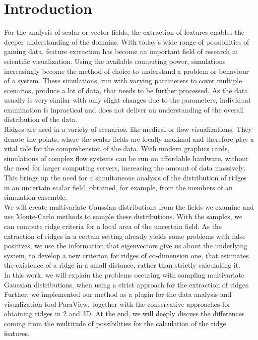 \chapter{Introduction}

For the analysis of scalar or vector fields, the extraction of features
enables the deeper understanding of the domains. With today's wide
range of possibilities of gaining data, feature extraction has become an
important field of research in scientific visualization. Using the
available computing power, simulations increasingly become the method of
choice to understand a problem or behaviour of a system. These simulations,
run with varying parameters to cover multiple scenarios, produce a lot
of data, that needs to be further processed. As the data usually is very
similar with only slight changes due to the parameters, individual
examination is inpractical and does not deliver an understanding of the
overall distribution of the data.\\
\indent Ridges are used in a variety of scenarios, like medical or flow
visualizations. They denote the points, where the scalar fields are
locally maximal and therefore play a vital role for the comprehension of
the data. With modern graphics cards, simulations of complex flow
systems can be run on affordable hardware, without the need for larger
computing servers, increasing the amount of data massively. This brings
up the need for a simultaneous analysis of the distribution of ridges in
an uncertain scalar field, obtained, for example, from the members of
an simulation ensemble.\\
\indent We will create multivariate Gaussian distributions from the
fields we examine and use Monte-Carlo methods to sample these
distributions. With the samples, we can compute ridge criteria for a
local area of the uncertain field. As the extraction of ridges in a
certain setting already yields some problems with false positives, we
use the information that eigenvectors give us about the underlying
system, to develop a new criterion for ridges of co-dimension one, that
estimates the existence of a ridge in a small distance, rather than
strictly calculating it.\\
\indent In this work, we will explain the problems occuring with
sampling multivariate Gaussian distributions, when using a strict
approach for the extraction of ridges. Further, we implemented our
method as a plugin for the data analysis and visualization tool
ParaView, together with the conservative approaches for obtaining ridges
in 2 and 3D. At the end, we will deeply discuss the differences coming
from the multitude of possibilities for the calculation of the ridge
features.
